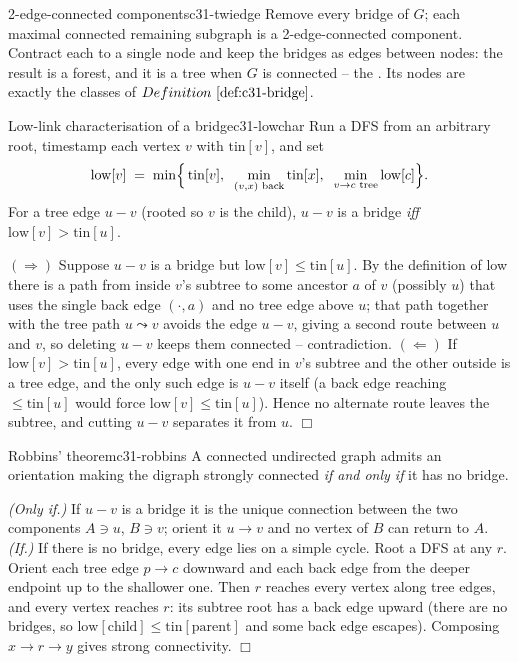 \begin{definition}{2-edge-connected components}{c31-twiedge}
Remove every bridge of \(G\); each maximal connected remaining subgraph is a
2-edge-connected component.  Contract each to a single node and keep the bridges
as edges between nodes: the result is a forest, and it is a tree when \(G\) is
connected -- the .  Its nodes are exactly the classes of
\(\defref{c31-bridge}\).
\end{definition}

\begin{lemma}{Low-link characterisation of a bridge}{c31-lowchar}
Run a DFS from an arbitrary root, timestamp each vertex \(v\) with
\(\mathrm{tin}[v]\), and set
\[
  \mathrm{low}[v] \;=\; \min\Bigl\{\, \mathrm{tin}[v],\;\; \min_{(v,x)\text{ back}}\mathrm{tin}[x],\;\; \min_{v\to c\text{ tree}}\mathrm{low}[c] \Bigr\}.
\]
For a tree edge \(u\!-\!v\) (rooted so \(v\) is the child), \(u\!-\!v\) is a
bridge \emph{iff} \(\mathrm{low}[v]>\mathrm{tin}[u]\).
\end{lemma}

\begin{proofbox}
\((\Rightarrow)\) Suppose \(u\!-\!v\) is a bridge but \(\mathrm{low}[v]\le\mathrm{tin}[u]\).
By the definition of low there is a path from inside \(v\)'s subtree to some
ancestor \(a\) of \(v\) (possibly \(u\)) that uses the single back edge
\((\cdot,a)\) and no tree edge above \(u\); that path together with the tree
path \(u\leadsto v\) avoids the edge \(u\!-\!v\), giving a second route between
\(u\) and \(v\), so deleting \(u\!-\!v\) keeps them connected -- contradiction.
\((\Leftarrow)\) If \(\mathrm{low}[v]>\mathrm{tin}[u]\), every edge with one end
in \(v\)'s subtree and the other outside is a tree edge, and the only such edge
is \(u\!-\!v\) itself (a back edge reaching \(\le\mathrm{tin}[u]\) would force
\(\mathrm{low}[v]\le\mathrm{tin}[u]\)).  Hence no alternate route leaves the
subtree, and cutting \(u\!-\!v\) separates it from \(u\). \(\Box\)
\end{proofbox}

\begin{theorem}{Robbins' theorem}{c31-robbins}
A connected undirected graph admits an orientation making the digraph strongly
connected \emph{if and only if} it has no bridge.
\end{theorem}

\begin{proofbox}
\emph{(Only if.)} If \(u\!-\!v\) is a bridge it is the unique connection between
the two components \(A\ni u\), \(B\ni v\); orient it \(u\to v\) and no vertex of
\(B\) can return to \(A\).  \emph{(If.)} If there is no bridge, every edge lies on
a simple cycle.  Root a DFS at any \(r\).  Orient each tree edge \(p\to c\)
downward and each back edge from the deeper endpoint up to the shallower one.
Then \(r\) reaches every vertex along tree edges, and every vertex reaches \(r\):
its subtree root has a back edge upward (there are no bridges, so
\(\mathrm{low}[\text{child}]\le\mathrm{tin}[\text{parent}]\) and some back edge
escapes).  Composing \(x\to r\to y\) gives strong connectivity. \(\Box\)
\end{proofbox}

